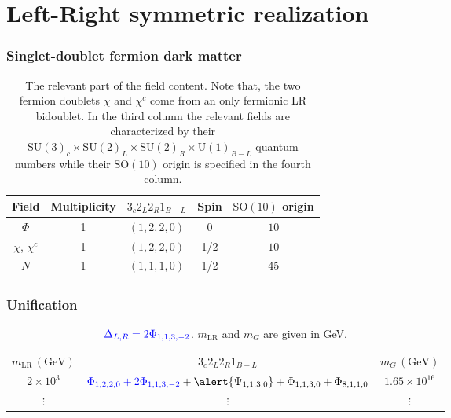 \documentclass[%
xcolor=dvipsnames,table%
]{beamer}
\begin{document}
\section{Left-Right symmetric realization}

\begin{frame}
  \frametitle{Singlet-doublet fermion dark matter}

\begin{table}[t]
\begin{tabular}{c|c|c|c|c}
{Field} & Multiplicity & $3_{c}2_{L}2_{R}1_{B-L}$& Spin & $\text{SO}(10)$ origin\\
\hline
$\Phi$ & 1 & $(1,2,2,0)$ & 0& $10$\\
$\chi$, $\chi^{c}$ & 1 & $(1,2,2,0)$ %
 & 1/2& $10$\\
 $N$  & 1 & $(1,1,1,0)$& 1/2& 45\\
\end{tabular}
\caption{The relevant part of the field content. Note that, the two fermion doublets $\chi$ and $\chi^{c}$ come from an only fermionic LR bidoublet. In the third column the relevant fields are
characterized by their $\text{SU}(3)_{c}\times \text{SU}(2)_{L}\times
\text{SU}(2)_{R}\times \text{U}(1)_{B-L}$ quantum numbers while their $\text{SO}(10)$
origin is specified in the fourth column. }
\label{tab:ModelI}
\end{table}
\end{frame}

\begin{frame}
  \frametitle{Unification}
  \begin{table}%
\small
{}
\begin{tabular}{c|c|c}
 $m_{\text{LR}} \,(\mbox{GeV})$ &  $3_{c}2_{L}2_{R}1_{B-L}$  & $m_{G}\,(\mbox{GeV})$ \\ \hline

 {$2\times 10^{3}$ }  & ${\color{blue}\Phi_{1,2,2,0}+2\Phi_{1,1,3,-2}}+\alert{\Psi_{1,1,3,0}} + \Phi_{1,1,3,0}+\Phi_{8,1,1,0}$ & $1.65 \times 10^{16}$   \\
 
 $\vdots$ &  $\vdots$  & $\vdots$   \\ 
\end{tabular}
\caption{ $\color{blue}{\Delta_{L,R}}=2\Phi_{1,1,3,-2}$. $m_{\text{LR}}$ and $m_{G}$ are given in GeV.}
\label{tab:I}
\end{table}

\end{frame}
\end{document}
